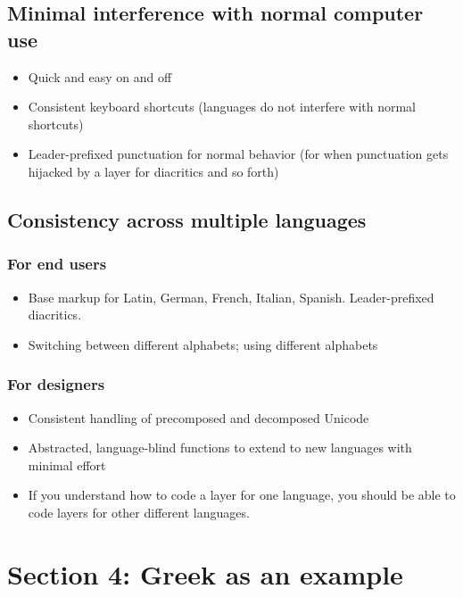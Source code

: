 \documentclass[11pt]{article}
\begin{document}
\subsection{Minimal interference with normal computer use}
\label{sec:org5cf3b89}

\begin{itemize}
\item Quick and easy on and off
\item Consistent keyboard shortcuts (languages do not interfere with normal shortcuts)
\item Leader-prefixed punctuation for normal behavior (for when punctuation gets hijacked by a layer for diacritics and so forth)
\end{itemize}

\subsection{Consistency across multiple languages}
\label{sec:org1463b49}

\subsubsection{For end users}
\label{sec:orgc525e5d}

\begin{itemize}
\item Base markup for Latin, German, French, Italian, Spanish. Leader-prefixed diacritics.
\item Switching between different alphabets; using different alphabets
\end{itemize}

\subsubsection{For designers}
\label{sec:org424bcac}

\begin{itemize}
\item Consistent handling of precomposed and decomposed Unicode
\item Abstracted, language-blind functions to extend to new languages with minimal effort
\item If you understand how to code a layer for one language, you should be able to code layers for other different languages.
\end{itemize}

\section{Section 4: Greek as an example}
\label{sec:orge23a9f4}
\end{document}
